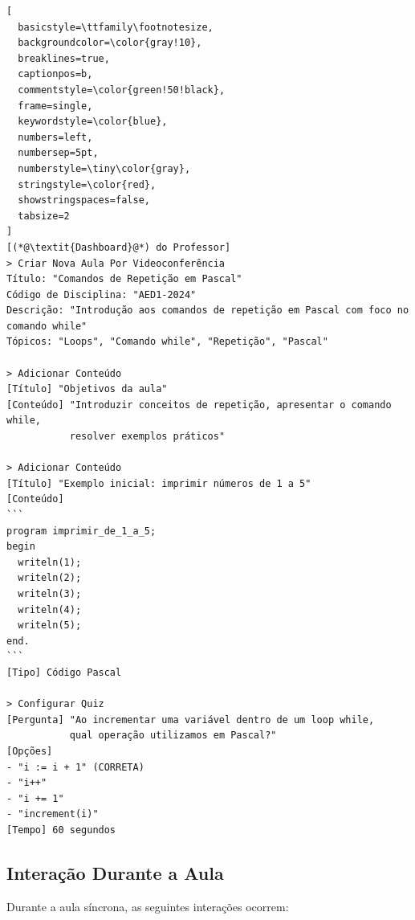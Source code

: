 \begin{lstlisting}[
  basicstyle=\ttfamily\footnotesize,
  backgroundcolor=\color{gray!10},
  breaklines=true,
  captionpos=b,
  commentstyle=\color{green!50!black},
  frame=single,
  keywordstyle=\color{blue},
  numbers=left,
  numbersep=5pt,
  numberstyle=\tiny\color{gray},
  stringstyle=\color{red},
  showstringspaces=false,
  tabsize=2
]
[(*@\textit{Dashboard}@*) do Professor]
> Criar Nova Aula Por Videoconferência
Título: "Comandos de Repetição em Pascal"
Código de Disciplina: "AED1-2024"
Descrição: "Introdução aos comandos de repetição em Pascal com foco no comando while"
Tópicos: "Loops", "Comando while", "Repetição", "Pascal"

> Adicionar Conteúdo
[Título] "Objetivos da aula"
[Conteúdo] "Introduzir conceitos de repetição, apresentar o comando while, 
           resolver exemplos práticos"

> Adicionar Conteúdo
[Título] "Exemplo inicial: imprimir números de 1 a 5"
[Conteúdo] 
```
program imprimir_de_1_a_5;
begin
  writeln(1);
  writeln(2);
  writeln(3);
  writeln(4);
  writeln(5);
end.
```
[Tipo] Código Pascal

> Configurar Quiz
[Pergunta] "Ao incrementar uma variável dentro de um loop while, 
           qual operação utilizamos em Pascal?"
[Opções] 
- "i := i + 1" (CORRETA)
- "i++"
- "i += 1"
- "increment(i)"
[Tempo] 60 segundos
\end{lstlisting}

\subsection{Interação Durante a Aula}
\label{subsec:interacao}

Durante a aula síncrona, as seguintes interações ocorrem:


